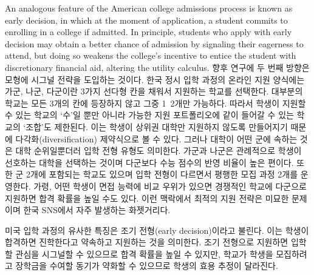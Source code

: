 \documentclass[11pt]{article} %
\theoremstyle{definition}
\theoremstyle{definition}
\begin{document}
An analogous feature of the American college admissions process is known as early decision, in which at the moment of application, a student commits to enrolling in a college if admitted. In principle, students who apply with early decision may obtain a better chance of admission by signaling their eagerness to attend, but doing so weakens the college's incentive to entice the student with discretionary financial aid, altering the utility calculus.
\else
향후 연구에 두 번째 방향은 모형에 시그널 전략을 도입하는 것이다. 한국 정시 입학 과정의 온라인 지원 양식에는 가군, 나군, 다군이란 3가지 선다형 칸을 채워서 지원하는 학교를 선택한다. 대부분의 학교는 모든 3개의 칸에 등장하지 않고 그중 1~2개만 가능하다. 따라서 학생이 지원할 수 있는 학교의 `수'일 뿐만 아니라 가능한 지원 포트폴리오에 같이 들어갈 수 있는 학교의 `조합'도 제한된다. 이는 학생이 상위권 대학만 지원하지 않도록 만들어지기 때문에 다각화(diversification) 제약식으로 볼 수 있다. 그러나 대학이 어떤 군에 속하는 것은 대학 순위일뿐더러 입학 전형 유형도 의미한다. 가군과 나군은 관례적으로 학생이 선호하는 대학을 선택하는 것이며 다군보다 수능 점수의 반영 비율이 높은 편이다. 또한 군 2개에 포함되는 학교도 있으며 입학 전형이 다르면서 평행한 모집 과정 2개를 운영한다. 가령, 어떤 학생이 면접 능력에 비교 우위가 있으면 경쟁적인 학교에 다군으로 지원하면 합격 확률을 높일 수도 있다. 이런 맥락에서 최적의 지원 전략은 미묘한 문제이며 한국 SNS에서 자주 발생하는 화젯거리다.

미국 입학 과정의 유사한 특징은 조기 전형(early decision)이라고 불린다. 이는 학생이 합격하면 진학한다고 약속하고 지원하는 것을 의미한다. 조기 전형으로 지원하면 입학할 관심을 시그널할 수 있으므로 합격 확률을 높일 수 있지만, 학교가 학생을 모집하려고 장학금을 수여할 동기가 약화할 수 있으므로 학생의 효용 추정이 달라진다.
\fi
\end{document}
